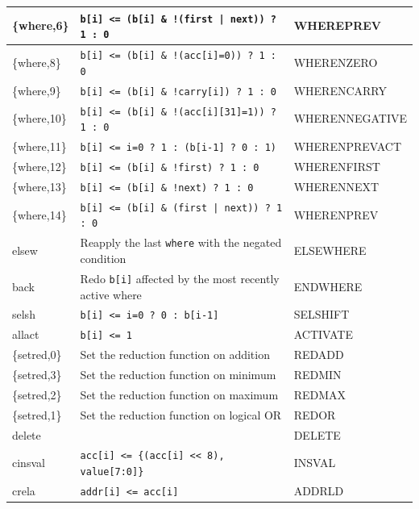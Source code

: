 {{\begin{longtable}{|l|l|l|}
\{where,6\}   & \texttt{b[i] <= (b[i] \& !(first | next)) ? 1 : 0} & WHEREPREV      \\ \hline
\{where,8\}   & \texttt{b[i] <= (b[i] \& !(acc[i]=0)) ? 1 : 0}    & WHERENZERO     \\ \hline
\{where,9\}   & \texttt{b[i] <= (b[i] \& !carry[i]) ? 1 : 0}      & WHERENCARRY    \\ \hline
\{where,10\}  & \texttt{b[i] <= (b[i] \& !(acc[i][31]=1)) ? 1 : 0} & WHERENNEGATIVE \\ \hline
\{where,11\}  & \texttt{b[i] <= i=0 ? 1 : (b[i-1] ? 0 : 1)}       & WHERENPREVACT  \\ \hline
\{where,12\}  & \texttt{b[i] <= (b[i] \& !first) ? 1 : 0}         & WHERENFIRST    \\ \hline
\{where,13\}  & \texttt{b[i] <= (b[i] \& !next) ? 1 : 0}          & WHERENNEXT     \\ \hline
\{where,14\}  & \texttt{b[i] <= (b[i] \& (first | next)) ? 1 : 0} & WHERENPREV     \\ \hline
elsew         & Reapply the last \texttt{where} with the negated condition & ELSEWHERE     \\ \hline
back          & Redo \texttt{b[i]} affected by the most recently active where & ENDWHERE     \\ \hline
selsh         & \texttt{b[i] <= i=0 ? 0 : b[i-1]}                 & SELSHIFT       \\ \hline
allact        & \texttt{b[i] <= 1}                                & ACTIVATE       \\ \hline
\{setred,0\}  & Set the reduction function on addition            & REDADD         \\ \hline
\{setred,3\}  & Set the reduction function on minimum             & REDMIN         \\ \hline
\{setred,2\}  & Set the reduction function on maximum             & REDMAX         \\ \hline
\{setred,1\}  & Set the reduction function on logical OR          & REDOR          \\ \hline
delete        &                                                  & DELETE         \\ \hline
cinsval       & \texttt{acc[i] <= \{(acc[i] << 8), value[7:0]\}}  & INSVAL         \\ \hline
crela         & \texttt{addr[i] <= acc[i]}                       & ADDRLD         \\ \hline
\end{longtable}
}}



